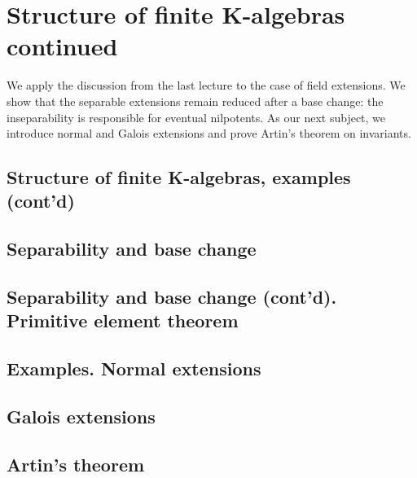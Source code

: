 \chapter{Structure of finite K-algebras continued}

We apply the discussion from the last lecture to the case of field
extensions. We show that the separable extensions remain reduced after
a base change: the inseparability is responsible for eventual
nilpotents. As our next subject, we introduce normal and Galois
extensions and prove Artin's theorem on invariants.

\section{Structure of finite K-algebras, examples (cont'd)}
\section{Separability and base change}
\section{Separability and base change (cont'd). Primitive element theorem}
\section{Examples. Normal extensions}
\section{Galois extensions}
\section{Artin's theorem}
